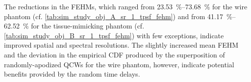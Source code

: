 The reductions in
the \acp{FEHM}, which ranged from
\SIrange{23.53}{73.68}{\percent} for
the wire phantom
(cf. \cref{tab:sim_study_obj_A_sr_1_tpsf_fehm}) and from
\SIrange{41.17}{62.52}{\percent} for
the tissue-mimicking phantom
(cf. \cref{tab:sim_study_obj_B_sr_1_tpsf_fehm}) with
few exceptions, indicate
improved spatial and
spectral resolutions.
The slightly increased mean \ac{FEHM} and
the deviation in
the empirical \ac{CDF} produced by
the superposition of
randomly-apodized \acp{QCW} for
the wire phantom, however, indicate
potential benefits provided by
the random time delays.
